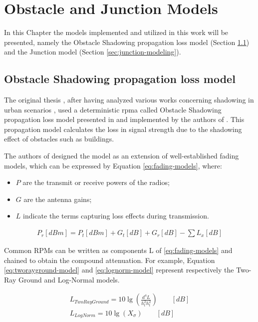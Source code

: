 
\chapter{Obstacle and Junction Models}	
	In this Chapter the models implemented and utilized in this work will be presented, namely the Obstacle Shadowing propagation loss model (Section \ref{sec:shadowing}) and the Junction model (Section \ref{sec:junction-modeling}).
	
	\section{Obstacle Shadowing propagation loss model}
		\label{sec:shadowing}
		The original thesis \cite{ROM2017}, after having analyzed various works concerning shadowing in urban scenarios \cite{Giordano:2010:CST:1860058.1860065} \cite{4020783}, used a deterministic \gls{rpma} called Obstacle Shadowing propagation loss model presented in \cite{5720204} and implemented by the authors of \cite{Carpenter:2015:OMI:2756509.2756512}.  This propagation model calculates the loss in signal strength due to the shadowing effect of obstacles such as buildings. 
		
		
		The authors of \cite{5720204} designed the model as an extension of well-established fading models, which can be expressed by Equation \ref{eq:fading-models}, where:
		\begin{itemize}
			\item $P$ are the transmit or receive powers of the radios;
			\item $G$ are the antenna gains;
			\item $L$ indicate the terms capturing loss effects during transmission.
		\end{itemize}
		
		\begin{gather}
			P_r[dBm] = P_t[dBm] + G_t[dB] + G_r[dB] - \sum L_x[dB] 														\label{eq:fading-models}
		\end{gather}
	
		Common RPMs can be written as components L of \ref{eq:fading-models} and chained to obtain the compound attenuation. For example, Equation \ref{eq:tworayground-model} and \ref{eq:lognorm-model} represent respectively the Two-Ray Ground and Log-Normal models.

		\begin{gather}
			L_{TwoRayGround} = 10 \lg \left( \frac{d^4 L}{h^2_t h^2_t} \right)	\qquad [dB]		\label{eq:tworayground-model} \\
			L_{LogNorm} = 10 \lg \left( X_\sigma \right)	\qquad [dB]													\label{eq:lognorm-model}
		\end{gather}
		
